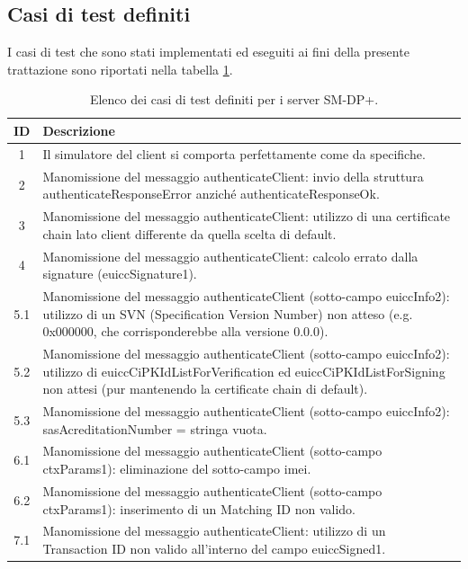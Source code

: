 \documentclass[10pt, oneside]{book}
\begin{document}
\subsection{Casi di test definiti}
I casi di test che sono stati implementati ed eseguiti ai fini della presente trattazione sono riportati nella tabella \ref{tab:servers-test-cases}.\\
\begin{table}[h!]
\begin{center}
\captionsetup{skip=4pt}
\caption{Elenco dei casi di test definiti per i server SM-DP+.}
\label{tab:servers-test-cases}
\begin{tabularx}{\textwidth}{|c|X|} %
\hline
\textbf{ID} & \textbf{Descrizione}\\
\hline
1 & Il simulatore del client si comporta perfettamente come da specifiche.\\
\hline
2 & Manomissione del messaggio authenticateClient: invio della struttura authenticateResponseError anziché authenticateResponseOk.\\
\hline
3 & Manomissione del messaggio authenticateClient: utilizzo di una certificate chain lato client differente da quella scelta di default.\\
\hline
4 & Manomissione del messaggio authenticateClient: calcolo errato dalla signature (euiccSignature1).\\
\hline
5.1 & Manomissione del messaggio authenticateClient (sotto-campo euiccInfo2): utilizzo di un SVN (Specification Version Number) non atteso (e.g. 0x000000, che corrisponderebbe alla versione 0.0.0).\\
\hline
5.2 & Manomissione del messaggio authenticateClient (sotto-campo euiccInfo2): utilizzo di euiccCiPKIdListForVerification ed euiccCiPKIdListForSigning non attesi (pur mantenendo la certificate chain di default).\\
\hline
5.3 & Manomissione del messaggio authenticateClient (sotto-campo euiccInfo2): sasAcreditationNumber = stringa vuota.\\
\hline
6.1 & Manomissione del messaggio authenticateClient (sotto-campo ctxParams1): eliminazione del sotto-campo imei.\\
\hline
6.2 & Manomissione del messaggio authenticateClient (sotto-campo ctxParams1): inserimento di un Matching ID non valido.\\
\hline
7.1 & Manomissione del messaggio authenticateClient: utilizzo di un Transaction ID non valido all'interno del campo euiccSigned1.\\

\end{tabularx}
\end{center}
\end{table}
\end{document}
